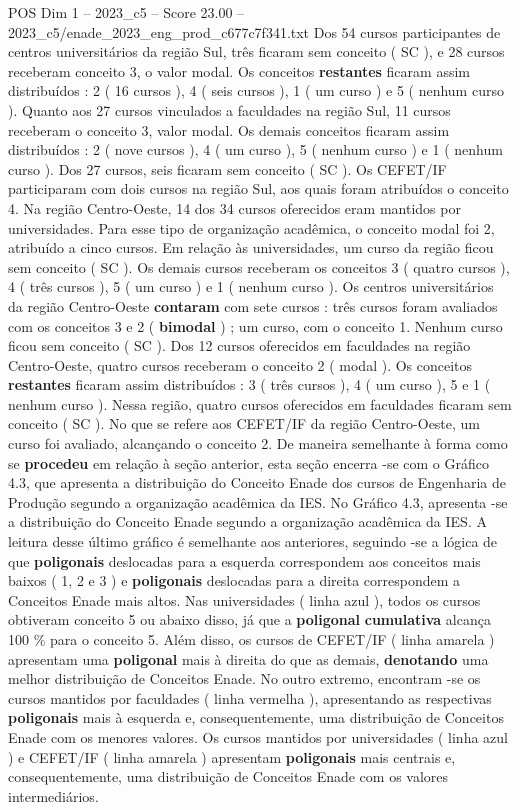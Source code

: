 \begin{textsample}{POS Dim 1 – 2023\_c5 – Score 23.00 – 2023\_c5/enade\_2023\_eng\_prod\_c677c7f341.txt}
Dos 54 cursos participantes de centros universitários da região Sul, três ficaram sem conceito ( SC ), e 28 cursos receberam conceito 3, o valor modal.
Os conceitos \textbf{restantes} ficaram assim distribuídos : 2 ( 16 cursos ), 4 ( seis cursos ), 1 ( um curso ) e 5 ( nenhum curso ).
Quanto aos 27 cursos vinculados a faculdades na região Sul, 11 cursos receberam o conceito 3, valor modal.
Os demais conceitos ficaram assim distribuídos : 2 ( nove cursos ), 4 ( um curso ), 5 ( nenhum curso ) e 1 ( nenhum curso ).
Dos 27 cursos, seis ficaram sem conceito ( SC ).
Os CEFET/IF participaram com dois cursos na região Sul, aos quais foram atribuídos o conceito 4.
Na região Centro-Oeste, 14 dos 34 cursos oferecidos eram mantidos por universidades.
Para esse tipo de organização acadêmica, o conceito modal foi 2, atribuído a cinco cursos.
Em relação às universidades, um curso da região ficou sem conceito ( SC ).
Os demais cursos receberam os conceitos 3 ( quatro cursos ), 4 ( três cursos ), 5 ( um curso ) e 1 ( nenhum curso ).
Os centros universitários da região Centro-Oeste \textbf{contaram} com sete cursos : três cursos foram avaliados com os conceitos 3 e 2 ( \textbf{bimodal} ) ; um curso, com o conceito 1.
Nenhum curso ficou sem conceito ( SC ).
Dos 12 cursos oferecidos em faculdades na região Centro-Oeste, quatro cursos receberam o conceito 2 ( modal ).
Os conceitos \textbf{restantes} ficaram assim distribuídos : 3 ( três cursos ), 4 ( um curso ), 5 e 1 ( nenhum curso ).
Nessa região, quatro cursos oferecidos em faculdades ficaram sem conceito ( SC ).
No que se refere aos CEFET/IF da região Centro-Oeste, um curso foi avaliado, alcançando o conceito 2.
De maneira semelhante à forma como se \textbf{procedeu} em relação à seção anterior, esta seção encerra -se com o Gráfico 4.3, que apresenta a distribuição do Conceito Enade dos cursos de Engenharia de Produção segundo a organização acadêmica da IES.
No Gráfico 4.3, apresenta -se a distribuição do Conceito Enade segundo a organização acadêmica da IES.
A leitura desse último gráfico é semelhante aos anteriores, seguindo -se a lógica de que \textbf{poligonais} deslocadas para a esquerda correspondem aos conceitos mais baixos ( 1, 2 e 3 ) e \textbf{poligonais} deslocadas para a direita correspondem a Conceitos Enade mais altos.
Nas universidades ( linha azul ), todos os cursos obtiveram conceito 5 ou abaixo disso, já que a \textbf{poligonal} \textbf{cumulativa} alcança 100 \% para o conceito 5.
Além disso, os cursos de CEFET/IF ( linha amarela ) apresentam uma \textbf{poligonal} mais à direita do que as demais, \textbf{denotando} uma melhor distribuição de Conceitos Enade.
No outro extremo, encontram -se os cursos mantidos por faculdades ( linha vermelha ), apresentando as respectivas \textbf{poligonais} mais à esquerda e, consequentemente, uma distribuição de Conceitos Enade com os menores valores.
Os cursos mantidos por universidades ( linha azul ) e CEFET/IF ( linha amarela ) apresentam \textbf{poligonais} mais centrais e, consequentemente, uma distribuição de Conceitos Enade com os valores intermediários.


\end{textsample}
